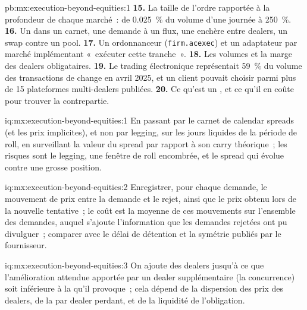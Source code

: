 \begin{solution}{pb:mx:execution-beyond-equities:1}
\textbf{15.} La taille de l'ordre rapportée à la profondeur de chaque marché~: de 0.025~\% du volume d'une journée à 250~\%.
\textbf{16.} Un  dans un carnet, une demande à un flux, une enchère entre dealers, un swap contre un pool.
\textbf{17.} Un ordonnanceur (\texttt{firm.acexec}) et un adaptateur par marché implémentant «~exécuter cette tranche~».
\textbf{18.} Les volumes et la marge des dealers obligataires.
\textbf{19.} Le trading électronique représentait 59~\% du volume des transactions de change en avril 2025, et un client pouvait choisir parmi plus de 15 plateformes multi-dealers publiées.
\textbf{20.} Ce qu'est un , et ce qu'il en coûte pour trouver la contrepartie.
\end{solution}

\begin{solution}{iq:mx:execution-beyond-equities:1}
En passant par le carnet de calendar spreads (et les prix implicites), et non par legging, sur les jours liquides de la période de roll, en surveillant la valeur du spread par rapport à son
carry théorique~; les risques sont le legging, une fenêtre de roll encombrée, et le spread qui évolue contre une grosse position.
\end{solution}

\begin{solution}{iq:mx:execution-beyond-equities:2}
Enregistrer, pour chaque demande, le mouvement de prix entre la demande et le rejet, ainsi que le prix obtenu lors de la nouvelle tentative~; le coût est la moyenne de ces mouvements sur l'ensemble des
demandes, auquel s'ajoute l'information que les demandes rejetées ont pu divulguer~; comparer avec le délai de détention et la symétrie publiés par le fournisseur.
\end{solution}

\begin{solution}{iq:mx:execution-beyond-equities:3}
On ajoute des dealers jusqu'à ce que l'amélioration attendue apportée par un dealer supplémentaire (la concurrence) soit inférieure à la  qu'il provoque~; cela dépend de la dispersion des prix des dealers,
de la  par dealer perdant, et de la liquidité de l'obligation.
\end{solution}

